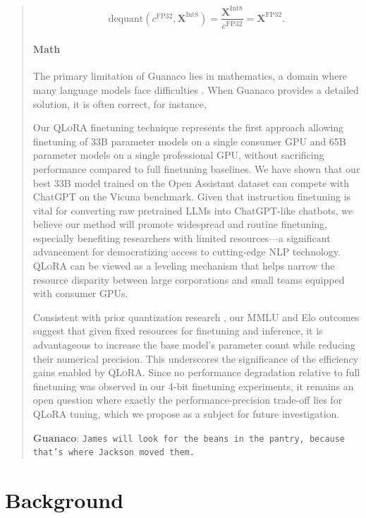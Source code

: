 \begin{quote}
\begin{equation}
    \text{dequant}(c^{\text{FP32}}, \mathbf{X}^{\text{Int8}}) = \frac{\mathbf{X}^{\text{Int8}}}{c^{\text{FP32}}} = \mathbf{X}^{\text{FP32}}.
\end{equation}

\paragraph{Math} The primary limitation of {Guanaco} lies in mathematics, a domain where many language models face difficulties \citep{liang2022holistic}. When {Guanaco} provides a detailed solution, it is often correct, for instance,

Our \textsc{QLoRA} finetuning technique represents the first approach allowing finetuning of 33B parameter models on a single consumer GPU and 65B parameter models on a single professional GPU, without sacrificing performance compared to full finetuning baselines. We have shown that our best 33B model trained on the Open Assistant dataset can compete with ChatGPT on the Vicuna benchmark. Given that instruction finetuning is vital for converting raw pretrained LLMs into ChatGPT-like chatbots, we believe our method will promote widespread and routine finetuning, especially benefiting researchers with limited resources—a significant advancement for democratizing access to cutting-edge NLP technology. \textsc{QLoRA} can be viewed as a leveling mechanism that helps narrow the resource disparity between large corporations and small teams equipped with consumer GPUs.

Consistent with prior quantization research \citep{dettmers2022case}, our MMLU and Elo outcomes suggest that given fixed resources for finetuning and inference, it is advantageous to increase the base model's parameter count while reducing their numerical precision. This underscores the significance of the efficiency gains enabled by \textsc{QLoRA}. Since no performance degradation relative to full finetuning was observed in our 4-bit finetuning experiments, it remains an open question where exactly the performance-precision trade-off lies for QLoRA tuning, which we propose as a subject for future investigation.

    \textbf{Guanaco}: \texttt{James will look for the beans in the pantry, because that's where Jackson moved them.}
\end{quote}

\section{Background}
